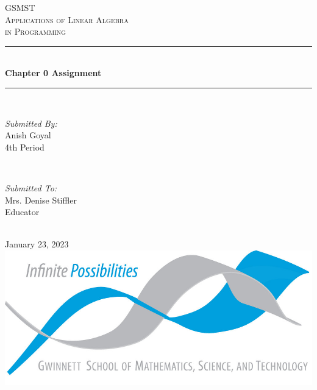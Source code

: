 \begin{titlepage}

    \newcommand{\HRule}{\rule{\linewidth}{0.5mm}}
    
    \center
    
    \textsc{\LARGE GSMST }\\[0.3cm]
    \textsc{\Large Applications of Linear Algebra }\\[0.3cm]
    \textsc{\Large in Programming}\\[0.5cm]
    
    \HRule \\[0.4cm]
    { \huge \bfseries Chapter 0 Assignment}\\[0.03cm]
    \HRule \\[1.5cm]
    
    \begin{minipage}{0.4\textwidth}
    \begin{flushleft} \large
    \emph{Submitted By:}\\
    Anish Goyal \\4th Period
    \end{flushleft}
    \end{minipage}
    ~
    \begin{minipage}{0.4\textwidth}
    \begin{flushright} \large
    \emph{Submitted To:} \\
    Mrs. Denise Stiffler\\Educator
    \end{flushright}
    \end{minipage}\\[1cm]
    
    {\large January 23, 2023}\\[1cm]
    
    \includegraphics{logo.png}\\[1cm]
    \vfill
    \end{titlepage}
